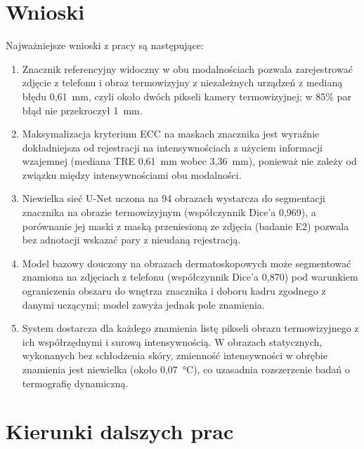 \section{Wnioski}
\label{sec:wnioski}

Najważniejsze wnioski z pracy są następujące:
\begin{enumerate}
  \item Znacznik referencyjny widoczny w obu modalnościach pozwala zarejestrować zdjęcie z telefonu i obraz termowizyjny z niezależnych urządzeń z medianą błędu 0,61~mm, czyli około dwóch pikseli kamery termowizyjnej; w 85\% par błąd nie przekroczył 1~mm.
  \item Maksymalizacja kryterium ECC na maskach znacznika jest wyraźnie dokładniejsza od rejestracji na intensywnościach z użyciem informacji wzajemnej (mediana TRE 0,61~mm wobec 3,36~mm), ponieważ nie zależy od związku między intensywnościami obu modalności.
  \item Niewielka sieć U-Net uczona na 94 obrazach wystarcza do segmentacji znacznika na obrazie termowizyjnym (współczynnik Dice'a 0,969), a porównanie jej maski z maską przeniesioną ze zdjęcia (badanie E2) pozwala bez adnotacji wskazać pary z nieudaną rejestracją.
  \item Model bazowy douczony na obrazach dermatoskopowych może segmentować znamiona na zdjęciach z telefonu (współczynnik Dice'a 0,870) pod warunkiem ograniczenia obszaru do wnętrza znacznika i doboru kadru zgodnego z danymi uczącymi; model zawyża jednak pole znamienia.
  \item System dostarcza dla każdego znamienia listę pikseli obrazu termowizyjnego z ich współrzędnymi i surową intensywnością. W obrazach statycznych, wykonanych bez schłodzenia skóry, zmienność intensywności w obrębie znamienia jest niewielka (około 0,07~°C), co uzasadnia rozszerzenie badań o termografię dynamiczną.
\end{enumerate}

\section{Kierunki dalszych prac}
\label{sec:dalsze-prace}

